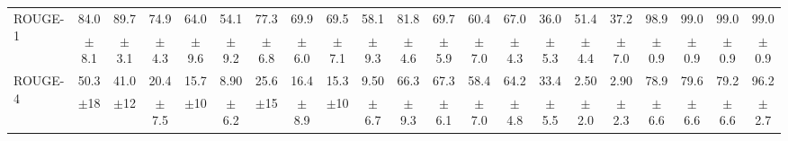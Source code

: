 \documentclass[main.tex]{subfiles}
\begin{document}
\begin{table}[t]
{\begin{tabular}{l|cccccccccc@{\hskip 2pt}|cccccccccc}
\multirow{2}{*}{ROUGE-1} & {\normalsize 84.0} & {\normalsize 89.7} & {\normalsize 74.9} & {\normalsize 64.0} & {\normalsize 54.1} & {\normalsize 77.3} & {\normalsize 69.9} & {\normalsize 69.5} & {\normalsize 58.1} & {\normalsize 81.8} & {\normalsize 69.7} & {\normalsize 60.4} & {\normalsize 67.0} & {\normalsize 36.0} & {\normalsize 51.4} & {\normalsize 37.2} & {\normalsize 98.9} & {\normalsize 99.0} & {\normalsize 99.0} & {\normalsize 99.0} \\
& {\footnotesize $\pm$8.1} & {\footnotesize $\pm$3.1} & {\footnotesize $\pm$4.3} & {\footnotesize $\pm$9.6} & {\footnotesize $\pm$9.2} & {\footnotesize $\pm$6.8} & {\footnotesize $\pm$6.0} & {\footnotesize $\pm$7.1} & {\footnotesize $\pm$9.3} & {\footnotesize $\pm$4.6} & {\footnotesize $\pm$5.9} & {\footnotesize $\pm$7.0} & {\footnotesize $\pm$4.3} & {\footnotesize $\pm$5.3} & {\footnotesize $\pm$4.4} & {\footnotesize $\pm$7.0} & {\footnotesize $\pm$0.9} & {\footnotesize $\pm$0.9} & {\footnotesize $\pm$0.9} & {\footnotesize $\pm$0.9} \\
\cline{2-21}

\multirow{2}{*}{ROUGE-4} & {\normalsize 50.3} & {\normalsize 41.0} & {\normalsize 20.4} & {\normalsize 15.7} & {\normalsize 8.90} & {\normalsize 25.6} & {\normalsize 16.4} & {\normalsize 15.3} & {\normalsize 9.50} & {\normalsize 66.3} & {\normalsize 67.3} & {\normalsize 58.4} & {\normalsize 64.2} & {\normalsize 33.4} & {\normalsize 2.50} & {\normalsize 2.90} & {\normalsize 78.9} & {\normalsize 79.6} & {\normalsize 79.2} & {\normalsize 96.2} \\
& {\footnotesize $\pm$18} & {\footnotesize $\pm$12} & {\footnotesize $\pm$7.5} & {\footnotesize $\pm$10} & {\footnotesize $\pm$6.2} & {\footnotesize $\pm$15} & {\footnotesize $\pm$8.9} & {\footnotesize $\pm$10} & {\footnotesize $\pm$6.7} & {\footnotesize $\pm$9.3} & {\footnotesize $\pm$6.1} & {\footnotesize $\pm$7.0} & {\footnotesize $\pm$4.8} & {\footnotesize $\pm$5.5} & {\footnotesize $\pm$2.0} & {\footnotesize $\pm$2.3} & {\footnotesize $\pm$6.6} & {\footnotesize $\pm$6.6} & {\footnotesize $\pm$6.6} & {\footnotesize $\pm$2.7} \\
\cline{2-21}


\end{tabular}}
\end{table}
\end{document}
